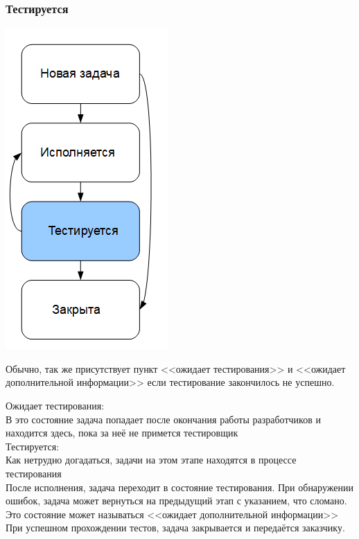 \documentclass{../industrial-development}
\begin{document}
\begin{frame} \frametitle{Тестируется}
\begin{minipage}{0.4\textwidth}
  \begin{flushleft}
		\includegraphics[height=0.8\textheight]{cyc4.png}
  \end{flushleft}
\end{minipage}
\begin{minipage}{0.59\textwidth}
  \begin{flushright}
		\begin{block}{}
			Обычно, так же присутствует пункт <<ожидает тестирования>> и <<ожидает дополнительной информации>> если тестирование закончилось не успешно.
		\end{block}
  \end{flushright}
\end{minipage}
\end{frame}
\lecturenotes
Ожидает тестирования:\\
В это состояние задача попадает после окончания работы разработчиков и находится здесь, пока за неё не примется тестировщик\\
Тестируется:\\
Как нетрудно догадаться, задачи на этом этапе находятся в процессе тестирования\\
После исполнения, задача переходит в состояние тестирования. При обнаружении ошибок, задача может вернуться на предыдущий этап с указанием, что сломано. Это состояние может называться <<ожидает дополнительной информации>>\\
При успешном прохождении тестов, задача закрывается и передаётся заказчику.		
\end{document}
